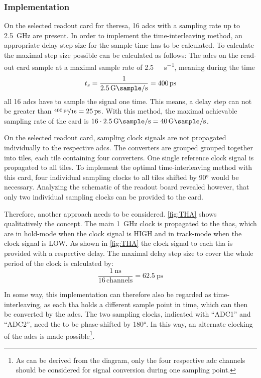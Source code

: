 \subsubsection{Implementation}\label{ssec:interl_impl}
On the selected readout card for \gls{theresa}, 16 \glspl{adc} with a sampling rate up to \SI{2.5}{\GHz} are present.
In order to implement the time-interleaving method, an appropriate delay step size for the sample time has to be calculated.
To calculate the maximal step size possible can be calculated as follows: 
The \glspl{adc} on the read-out card sample at a maximal sample rate of \SI{2.5}{\giga\sample\per\second}, meaning during the time
\begin{equation}
	t_s = \frac{1}{\SI{2.5}{\giga \sample \per \second}} = \SI{400}{\pico \second}
\end{equation}
all 16 \glspl{adc} have to sample the signal one time.
This means, a delay step can not be greater than $\nicefrac{\SI{400}{\pico\second}}{16} = \SI{25}{\pico\second}$.
With this method, the maximal achievable sampling rate of the card is $16 \cdot \SI{2.5}{\giga\sample\per\second}  = \SI{40}{\giga\sample\per\second}$. 

On the selected readout card, sampling clock signals are not propagated individually to the respective \glspl{adc}.
The converters are grouped grouped together into tiles, each tile containing four converters. One single reference clock signal is propagated to all tiles. 
To implement the optimal time-interleaving method with this card, four individual sampling clocks to all tiles shifted by \ang{90} would be necessary.
Analyzing the schematic of the readout board revealed however, that only two individual sampling clocks can be provided to the card.

Therefore, another approach needs to be considered.
\autoref{fig:THA} shows qualitatively the concept.
The main \SI{1}{\GHz} clock is propagated to the \glspl{tha}, which are in hold-mode when the clock signal is HIGH and in track-mode when the clock signal is LOW.
As shown in \autoref{fig:THA} the clock signal to each \gls{tha} is provided with a respective delay.
The maximal delay step size to cover the whole period of the clock is calculated by: 
\begin{equation}
	\frac{\SI{1}{\nano\second}}{16 \, \text{channels}} = \SI{62.5}{\pico\second}
\end{equation}

In some way, this implementation can therefore also be regarded as time-interleaving, as each \gls{tha} holds a different sample point in time, which can then be converted by the \glspl{adc}.
The two sampling clocks, indicated with ``ADC1'' and ``ADC2'', need the to be phase-shifted by \ang{180}.
In this way, an alternate clocking of the \glspl{adc} is made possible\footnote{As can be derived from the diagram, only the four respective \gls{adc} channels should be considered for signal conversion during one sampling point.}.

